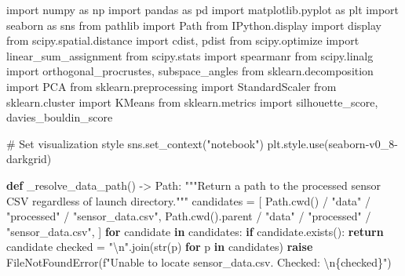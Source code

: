 \documentclass[
  letterpaper,
  DIV=11,
  numbers=noendperiod]{scrartcl}
\newenvironment{Shaded}{\begin{snugshade}}{\end{snugshade}}
\newcommand{\BuiltInTok}[1]{\textcolor[rgb]{0.00,0.23,0.31}{#1}}
\newcommand{\CharTok}[1]{\textcolor[rgb]{0.13,0.47,0.30}{#1}}
\newcommand{\CommentTok}[1]{\textcolor[rgb]{0.37,0.37,0.37}{#1}}
\newcommand{\ControlFlowTok}[1]{\textcolor[rgb]{0.00,0.23,0.31}{\textbf{#1}}}
\newcommand{\ImportTok}[1]{\textcolor[rgb]{0.00,0.46,0.62}{#1}}
\newcommand{\KeywordTok}[1]{\textcolor[rgb]{0.00,0.23,0.31}{\textbf{#1}}}
\newcommand{\NormalTok}[1]{\textcolor[rgb]{0.00,0.23,0.31}{#1}}
\newcommand{\OperatorTok}[1]{\textcolor[rgb]{0.37,0.37,0.37}{#1}}
\newcommand{\PreprocessorTok}[1]{\textcolor[rgb]{0.68,0.00,0.00}{#1}}
\newcommand{\SpecialCharTok}[1]{\textcolor[rgb]{0.37,0.37,0.37}{#1}}
\newcommand{\SpecialStringTok}[1]{\textcolor[rgb]{0.13,0.47,0.30}{#1}}
\newcommand{\StringTok}[1]{\textcolor[rgb]{0.13,0.47,0.30}{#1}}
\renewenvironment{Shaded}{%
  \begin{tcolorbox}[%
    enhanced,%
    colback=codebg,%
    colframe=codebg,%
    borderline west={3pt}{0pt}{sectionblue},%
    fontupper=\small\ttfamily,%
    boxrule=0pt,%
    arc=0pt,%
    boxsep=5pt,%
    left=2mm,%
    right=2mm,%
    top=2mm,%
    bottom=2mm%
  ]%
}{%
  \end{tcolorbox}%
}
\begin{document}
\begin{Shaded}
\begin{Highlighting}[]
\ImportTok{import}\NormalTok{ numpy }\ImportTok{as}\NormalTok{ np}
\ImportTok{import}\NormalTok{ pandas }\ImportTok{as}\NormalTok{ pd}
\ImportTok{import}\NormalTok{ matplotlib.pyplot }\ImportTok{as}\NormalTok{ plt}
\ImportTok{import}\NormalTok{ seaborn }\ImportTok{as}\NormalTok{ sns}
\ImportTok{from}\NormalTok{ pathlib }\ImportTok{import}\NormalTok{ Path}
\ImportTok{from}\NormalTok{ IPython.display }\ImportTok{import}\NormalTok{ display}
\ImportTok{from}\NormalTok{ scipy.spatial.distance }\ImportTok{import}\NormalTok{ cdist, pdist}
\ImportTok{from}\NormalTok{ scipy.optimize }\ImportTok{import}\NormalTok{ linear\_sum\_assignment}
\ImportTok{from}\NormalTok{ scipy.stats }\ImportTok{import}\NormalTok{ spearmanr}
\ImportTok{from}\NormalTok{ scipy.linalg }\ImportTok{import}\NormalTok{ orthogonal\_procrustes, subspace\_angles}
\ImportTok{from}\NormalTok{ sklearn.decomposition }\ImportTok{import}\NormalTok{ PCA}
\ImportTok{from}\NormalTok{ sklearn.preprocessing }\ImportTok{import}\NormalTok{ StandardScaler}
\ImportTok{from}\NormalTok{ sklearn.cluster }\ImportTok{import}\NormalTok{ KMeans}
\ImportTok{from}\NormalTok{ sklearn.metrics }\ImportTok{import}\NormalTok{ silhouette\_score, davies\_bouldin\_score}

\CommentTok{\# Set visualization style}
\NormalTok{sns.set\_context(}\StringTok{"notebook"}\NormalTok{)}
\NormalTok{plt.style.use(}\StringTok{\textquotesingle{}seaborn{-}v0\_8{-}darkgrid\textquotesingle{}}\NormalTok{)}

\KeywordTok{def}\NormalTok{ \_resolve\_data\_path() }\OperatorTok{{-}\textgreater{}}\NormalTok{ Path:}
    \CommentTok{"""Return a path to the processed sensor CSV regardless of launch directory."""}
\NormalTok{    candidates }\OperatorTok{=}\NormalTok{ [}
\NormalTok{        Path.cwd() }\OperatorTok{/} \StringTok{"data"} \OperatorTok{/} \StringTok{"processed"} \OperatorTok{/} \StringTok{"sensor\_data.csv"}\NormalTok{,}
\NormalTok{        Path.cwd().parent }\OperatorTok{/} \StringTok{"data"} \OperatorTok{/} \StringTok{"processed"} \OperatorTok{/} \StringTok{"sensor\_data.csv"}\NormalTok{,}
\NormalTok{    ]}
    \ControlFlowTok{for}\NormalTok{ candidate }\KeywordTok{in}\NormalTok{ candidates:}
        \ControlFlowTok{if}\NormalTok{ candidate.exists():}
            \ControlFlowTok{return}\NormalTok{ candidate}
\NormalTok{    checked }\OperatorTok{=} \StringTok{"}\CharTok{\textbackslash{}n}\StringTok{"}\NormalTok{.join(}\BuiltInTok{str}\NormalTok{(p) }\ControlFlowTok{for}\NormalTok{ p }\KeywordTok{in}\NormalTok{ candidates)}
    \ControlFlowTok{raise} \PreprocessorTok{FileNotFoundError}\NormalTok{(}\SpecialStringTok{f"Unable to locate sensor\_data.csv. Checked: }\CharTok{\textbackslash{}n}\SpecialCharTok{\{}\NormalTok{checked}\SpecialCharTok{\}}\SpecialStringTok{"}\NormalTok{)}


\end{Highlighting}
\end{Shaded}
\end{document}
